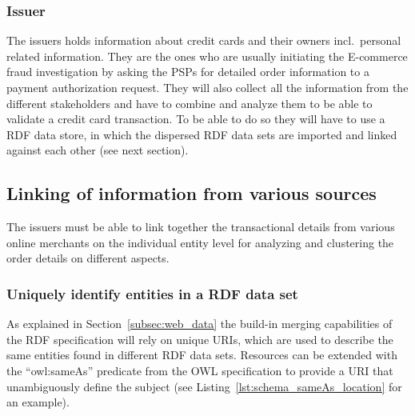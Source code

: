 \subsubsection{Issuer}
\label{subsub:prep_info_issuer}

The issuers holds information about credit cards and their owners incl.\ personal related information. They are the ones who are usually initiating the \gls{E-commerce} fraud investigation by asking the \gls{PSP}s for detailed order information to a payment authorization request. They will also collect all the information from the different stakeholders and have to combine and analyze them to be able to validate a credit card transaction. To be able to do so they will have to use a \gls{RDF} data store, in which the dispersed \gls{RDF} data sets are imported and linked against each other (see next section).

\subsection{Linking of information from various sources}
\label{subsec:information_mapping}

The issuers must be able to link together the transactional details from various online merchants on the individual entity level for analyzing and clustering the order details on different aspects.

\subsubsection{Uniquely identify entities in a \gls{RDF} data set}
\label{subsub:info_unique_id}

As explained in Section~\ref{subsec:web_data} the build-in merging capabilities of the \gls{RDF} specification will rely on unique \gls{URI}s, which are used to describe the same entities found in different \gls{RDF} data sets. Resources can be extended with the ``owl:sameAs'' predicate from the \gls{OWL} specification to provide a \gls{URI} that unambiguously define the subject (see Listing~\ref{lst:schema_sameAs_location} for an example). \@


